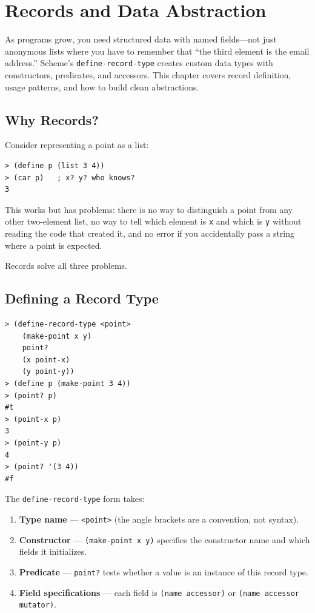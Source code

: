 \chapter{Records and Data Abstraction}
\label{ch:records}

As programs grow, you need structured data with named fields---not just anonymous lists where you have to remember that ``the third element is the email address.'' Scheme's \texttt{define-record-type} creates custom data types with constructors, predicates, and accessors. This chapter covers record definition, usage patterns, and how to build clean abstractions.

\section{Why Records?}

Consider representing a point as a list:

\begin{lstlisting}[style=repl]
> (define p (list 3 4))
> (car p)   ; x? y? who knows?
3
\end{lstlisting}

This works but has problems: there is no way to distinguish a point from any other two-element list, no way to tell which element is \texttt{x} and which is \texttt{y} without reading the code that created it, and no error if you accidentally pass a string where a point is expected.

Records solve all three problems.

\section{Defining a Record Type}

\begin{lstlisting}[style=repl]
> (define-record-type <point>
    (make-point x y)
    point?
    (x point-x)
    (y point-y))
> (define p (make-point 3 4))
> (point? p)
#t
> (point-x p)
3
> (point-y p)
4
> (point? '(3 4))
#f
\end{lstlisting}

The \texttt{define-record-type} form takes:

\begin{enumerate}
    \item \textbf{Type name} --- \texttt{<point>} (the angle brackets are a convention, not syntax).
    \item \textbf{Constructor} ---
    \texttt{(make-point x y)} specifies the constructor name and
    which fields it initializes.
    \item \textbf{Predicate} --- \texttt{point?} tests whether a value is an instance of this record type.
    \item \textbf{Field specifications} --- each
    field is \texttt{(name accessor)} or
    \texttt{(name accessor mutator)}.
\end{enumerate}

